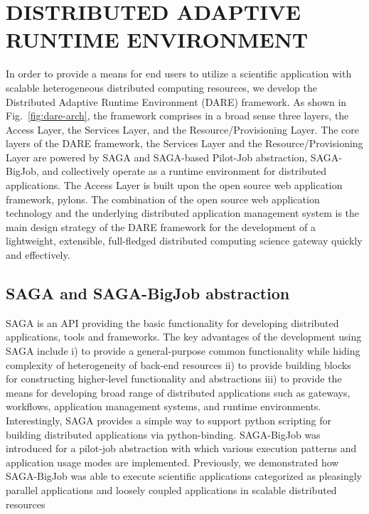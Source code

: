 \documentclass{sig-alternate}
\begin{document}
\section{DISTRIBUTED ADAPTIVE RUNTIME ENVIRONMENT}
In order to provide a means for end users to utilize a scientific application with scalable heterogeneous distributed computing resources, we develop the Distributed Adaptive Runtime Environment (DARE) framework\cite{dareurl}.  As shown in Fig.~\ref{fig:dare-arch}, the framework comprises in a broad sense three layers, the Access Layer, the Services Layer, and the Resource/Provisioning Layer.  The core layers of the DARE framework, the Services Layer and the Resource/Provisioning Layer are powered by SAGA and SAGA-based Pilot-Job abstraction, SAGA-BigJob\cite{saga-ccgrid10,saga-royalsoc,saga-web,jha2009developing,ecmls10, ecmls11}, and collectively operate as a runtime environment for distributed applications.  The Access Layer is built upon the open source web application framework, pylons\cite{pylonsurl}.  The combination of the open source web application technology and the underlying distributed application management system is the main design strategy of the DARE framework for the development of a lightweight, extensible, full-fledged distributed computing science gateway quickly and effectively\cite{pylonsurl}. 

\subsection{SAGA and SAGA-BigJob abstraction}
SAGA is an API providing the basic functionality for developing distributed applications, tools and frameworks\cite{saga-web}. The key advantages of the development using SAGA include i) to provide a general-purpose common functionality while hiding complexity of heterogeneity of back-end resources ii) to provide building blocks for constructing higher-level functionality and abstractions iii) to provide the means for developing broad range of distributed applications such as gateways, workflows, application management systems, and runtime environments.   Interestingly, SAGA provides a simple way to support python scripting for building distributed applications via python-binding.  SAGA-BigJob was introduced for a pilot-job abstraction with which various execution patterns and application usage modes are implemented.  Previously, we demonstrated how SAGA-BigJob was able to execute scientific applications categorized as pleasingly parallel applications and loosely coupled applications in scalable distributed resources\cite{saga-royalsoc,jha2009developing, ecmls10, ecmls11}
\end{document}
